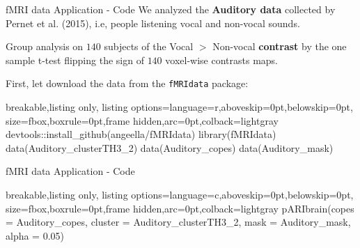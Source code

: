 \documentclass{beamer}
\begin{document}
%
%

\begin{frame}[fragile]{fMRI data Application - Code}
We analyzed the \textcolor{bluenight}{\textbf{Auditory data}} collected by Pernet et al. (2015), i.e, people listening vocal and non-vocal sounds. 
\vspace{.2cm}

Group analysis on $140$ subjects of the Vocal $>$ Non-vocal \textcolor{bluenight}{\textbf{contrast}} by the one sample t-test flipping the sign of $140$ voxel-wise contrasts maps. 
\vspace{.5cm}

First, let download the data from the \texttt{fMRIdata} package:

\vspace{.5cm}
\begin{tcblisting}{breakable,listing only,
		listing options={language=r,aboveskip=0pt,belowskip=0pt},
		size=fbox,boxrule=0pt,frame hidden,arc=0pt,colback=lightgray}
devtools::install_github(angeella/fMRIdata)
library(fMRIdata)
data(Auditory_clusterTH3_2)
data(Auditory_copes)
data(Auditory_mask)
\end{tcblisting}

\end{frame}

\begin{frame}[fragile]{fMRI data Application - Code}

\begin{tcblisting}{breakable,listing only,
		listing options={language=c,aboveskip=0pt,belowskip=0pt},
		size=fbox,boxrule=0pt,frame hidden,arc=0pt,colback=lightgray}
pARIbrain(copes = Auditory_copes, 
          cluster = Auditory_clusterTH3_2,
          mask = Auditory_mask, 
          alpha = 0.05)
\end{tcblisting}


\end{frame}
\end{document}
